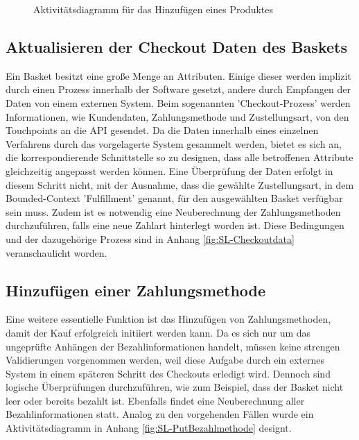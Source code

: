 \begin{figure}[h!]
	\centering
	
	\caption{Aktivitätsdiagramm für das Hinzufügen eines Produktes }
	\label{fig:SL-AddProduct}
\end{figure}

\subsection{Aktualisieren der Checkout Daten des Baskets}

Ein Basket besitzt eine große Menge an Attributen. Einige dieser werden implizit durch einen Prozess innerhalb der Software gesetzt, andere durch Empfangen der Daten von einem externen System. Beim sogenannten 'Checkout-Prozess' werden Informationen, wie Kundendaten, Zahlungsmethode und Zustellungsart, von den Touchpoints an die API gesendet. Da die Daten innerhalb eines einzelnen Verfahrens durch das vorgelagerte System gesammelt werden, bietet es sich an, die korrespondierende Schnittstelle so zu designen, dass alle betroffenen Attribute gleichzeitig angepasst werden können. Eine Überprüfung der Daten erfolgt in diesem Schritt nicht, mit der Ausnahme, dass die gewählte Zustellungsart, in dem Bounded-Context 'Fulfillment' genannt, für den ausgewählten Basket verfügbar sein muss. Zudem ist es notwendig eine Neuberechnung der Zahlungsmethoden durchzuführen, falls eine neue Zahlart hinterlegt worden ist. Diese Bedingungen und der dazugehörige Prozess sind in Anhang \ref{fig:SL-Checkoutdata} veranschaulicht worden.


\subsection{Hinzufügen einer Zahlungsmethode}

Eine weitere essentielle Funktion ist das Hinzufügen von Zahlungsmethoden, damit der Kauf erfolgreich initiiert werden kann. Da es sich nur um das ungeprüfte Anhängen der Bezahlinformationen handelt, müssen keine strengen Validierungen vorgenommen werden, weil diese Aufgabe durch ein externes System in einem späteren Schritt des Checkouts erledigt wird. Dennoch sind logische Überprüfungen durchzuführen, wie zum Beispiel, dass der Basket nicht leer oder bereits bezahlt ist. Ebenfalls findet eine Neuberechnung aller Bezahlinformationen statt. Analog zu den vorgehenden Fällen wurde ein Aktivitätsdiagramm in Anhang \ref{fig:SL-PutBezahlmethode} designt.

